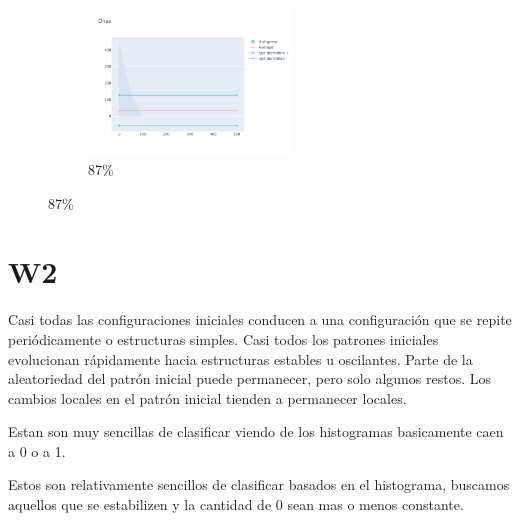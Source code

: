 \documentclass[12pt, fleqn]{report}                             %
\theoremstyle{break}                                            %
\begin{document}
\begin{figure}[ht!]
\begin{subfigure}[b]{0.4\linewidth}
          \includegraphics[width=0.6\textwidth]{Images/168/dia-d.png}
          \caption{87\%}
        \end{subfigure}
      \end{figure}























      \clearpage
      \section{W2}
              

      Casi todas las configuraciones iniciales conducen a una configuración que se repite periódicamente o estructuras
      simples.
      Casi todos los patrones iniciales evolucionan rápidamente hacia estructuras estables u 
      oscilantes. Parte de la aleatoriedad del patrón inicial 
      puede permanecer, pero solo algunos restos. Los cambios locales en el 
      patrón inicial tienden a permanecer locales.

      Estan son muy sencillas de clasificar viendo de los histogramas basicamente caen a 0 o a 1.

      Estos son relativamente sencillos de clasificar basados en el histograma, buscamos aquellos
      que se estabilizen y la cantidad de 0 sean mas o menos constante.
            
\end{document}
